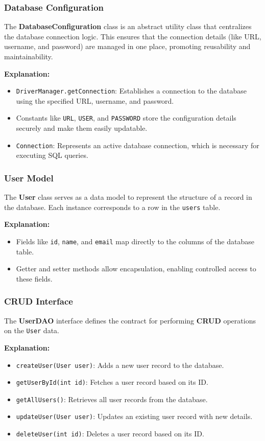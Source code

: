 \documentclass{article}
\begin{document}
\subsubsection{Database Configuration}

The \textbf{DatabaseConfiguration} class is an abstract utility class that centralizes the database connection logic. This ensures that the connection details (like URL, username, and password) are managed in one place, promoting reusability and maintainability.

\textbf{Explanation:}
\begin{itemize}
    \item \texttt{DriverManager.getConnection}: Establishes a connection to the database using the specified URL, username, and password.
    \item Constants like \texttt{URL}, \texttt{USER}, and \texttt{PASSWORD} store the configuration details securely and make them easily updatable.
    \item \texttt{Connection}: Represents an active database connection, which is necessary for executing SQL queries.
\end{itemize}

\subsubsection{User Model}

The \textbf{User} class serves as a data model to represent the structure of a record in the database. Each instance corresponds to a row in the \texttt{users} table.

\textbf{Explanation:}
\begin{itemize}
    \item Fields like \texttt{id}, \texttt{name}, and \texttt{email} map directly to the columns of the database table.
    \item Getter and setter methods allow encapsulation, enabling controlled access to these fields.
\end{itemize}

\subsubsection{CRUD Interface}

The \textbf{UserDAO} interface defines the contract for performing \textbf{CRUD} operations on the \texttt{User} data.

\textbf{Explanation:}
\begin{itemize}
    \item \texttt{createUser(User user)}: Adds a new user record to the database.
    \item \texttt{getUserById(int id)}: Fetches a user record based on its ID.
    \item \texttt{getAllUsers()}: Retrieves all user records from the database.
    \item \texttt{updateUser(User user)}: Updates an existing user record with new details.
    \item \texttt{deleteUser(int id)}: Deletes a user record based on its ID.
\end{itemize}
\end{document}
